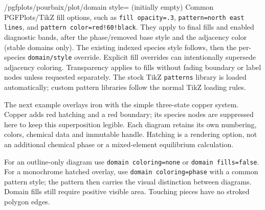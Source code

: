 \documentclass[a4paper,11pt]{ltxdoc}
\begin{document}
\begin{key}{/pgfplots/pourbaix/plot/domain style= (initially empty)}
Common PGFPlots/TikZ fill options, such as \texttt{fill opacity=.3},
\texttt{pattern=north east lines}, and \texttt{pattern color=red!60!black}.
They apply to final fills and enabled diagnostic bands, after the phase/removed
base style and the adjacency color (stable domains only). The existing indexed
species style follows, then the per-species \texttt{domain/style} override.
Explicit fill overrides can intentionally supersede adjacency coloring.
Transparency applies to fills without fading boundary or label nodes unless
requested separately. The stock TikZ \texttt{patterns} library is loaded automatically;
custom pattern libraries follow the normal TikZ loading rules.
\end{key}

The next example overlays iron with the simple three-state copper system. Copper
adds red hatching and a red boundary; its species nodes are suppressed here to
keep this superposition legible. Each diagram retains its own numbering, colors,
chemical data and immutable handle. Hatching is a rendering option, not an
additional chemical phase or a mixed-element equilibrium calculation.
\begin{codeexample}[width=8cm]
\usetikzlibrary{patterns}
\end{codeexample}
For an outline-only diagram use \texttt{domain coloring=none} or
\texttt{domain fills=false}. For a monochrome hatched overlay, use
\texttt{domain coloring=phase} with a common pattern style; the pattern then
carries the visual distinction between diagrams. Domain fills still require
positive visible area. Touching pieces have no stroked polygon edges.
\end{document}

